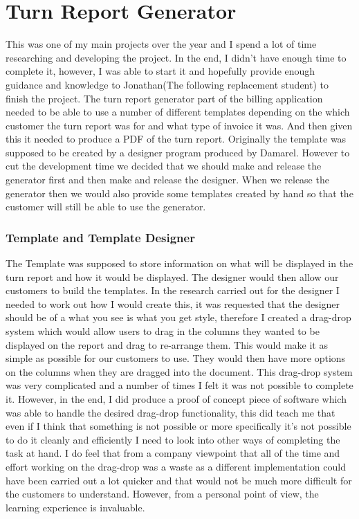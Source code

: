 \section{Turn Report Generator}{
	This was one of my main projects over the year and I spend a lot of time researching and developing the project. In the end, I didn't have enough time to complete it, however, I was able to start it and hopefully provide enough guidance and knowledge to Jonathan(The following replacement student) to finish the project. The turn report generator part of the billing application needed to be able to use a number of different templates depending on the which customer the turn report was for and what type of invoice it was. And then given this it needed to produce a PDF of the turn report. Originally the template was supposed to be created by a designer program produced by Damarel. However to cut the development time we decided that we should make and release the generator first and then make and release the designer. When we release the generator then we would also provide some templates created by hand so that the customer will still be able to use the generator.
	\subsubsection*{Template and Template Designer}{
		The Template was supposed to store information on what will be displayed in the turn report and how it would be displayed. The designer would then allow our customers to build the templates. In the research carried out for the designer I needed to work out how I would create this, it was requested that the designer should be of a what you see is what you get style, therefore I created a drag-drop system which would allow users to drag in the columns they wanted to be displayed on the report and drag to re-arrange them. This would make it as simple as possible for our customers to use. They would then have more options on the columns when they are dragged into the document. This drag-drop system was very complicated and a number of times I felt it was not possible to complete it. However, in the end, I did produce a proof of concept piece of software which was able to handle the desired drag-drop functionality, this did teach me that even if I think that something is not possible or more specifically it's not possible to do it cleanly and efficiently I need to look into other ways of completing the task at hand. I do feel that from a company viewpoint that all of the time and effort working on the drag-drop was a waste as a different implementation could have been carried out a lot quicker and that would not be much more difficult for the customers to understand. However, from a personal point of view, the learning experience is invaluable.
	}
}
